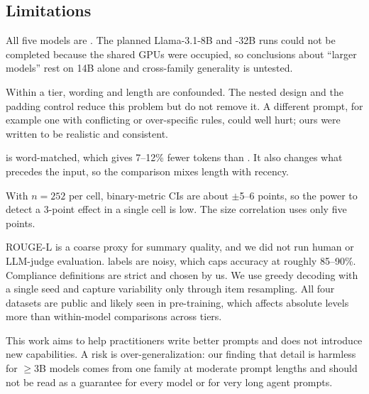 \subsection{Limitations}
\label{sec:limitations}

All five models are \qwen. The planned Llama-3.1-8B and \qwen-32B runs could not be completed because the shared GPUs were occupied, so conclusions about ``larger models'' rest on 14B alone and cross-family generality is untested.

Within a tier, wording and length are confounded.
The nested design and the padding control reduce this problem but do not remove it.
A different \exhaustive prompt, for example one with conflicting or over-specific rules, could well hurt; ours were written to be realistic and consistent.

\padded is word-matched, which gives 7--12\% fewer tokens than \exhaustive.
It also changes what precedes the input, so the \padded\versus\standard comparison mixes length with recency.

With $n=252$ per cell, binary-metric CIs are about $\pm$5--6 points, so the power to detect a 3-point effect in a single cell is low.
The size correlation uses only five points.

ROUGE-L is a coarse proxy for summary quality, and we did not run human or LLM-judge evaluation.
\agnews labels are noisy, which caps accuracy at roughly 85--90\%.
Compliance definitions are strict and chosen by us.
We use greedy decoding with a single seed and capture variability only through item resampling.
All four datasets are public and likely seen in pre-training, which affects absolute levels more than within-model comparisons across tiers.

This work aims to help practitioners write better prompts and does not introduce new capabilities.
A risk is over-generalization: our finding that detail is harmless for $\geq$3B models comes from one family at moderate prompt lengths and should not be read as a guarantee for every model or for very long agent prompts.
